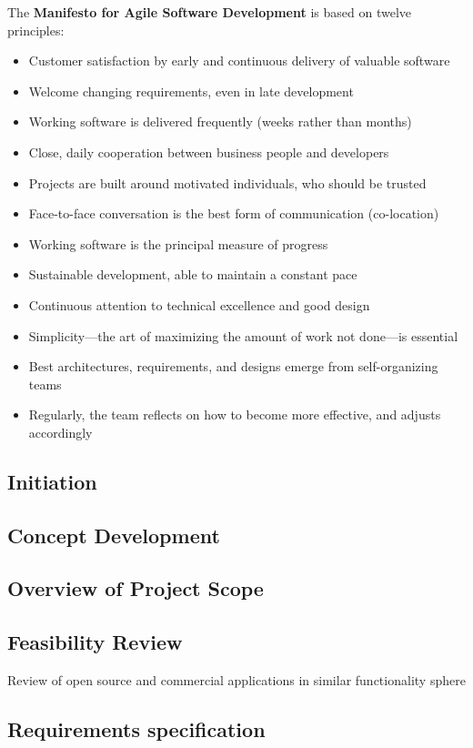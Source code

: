 \documentclass[a4paper,12pt]{article}
\begin{document}
\begin{samepage}
The \textbf{Manifesto for Agile Software Development} is based on twelve principles:
\begin{itemize}
\item Customer satisfaction by early and continuous delivery of valuable software
\item Welcome changing requirements, even in late development
\item Working software is delivered frequently (weeks rather than months)
\item Close, daily cooperation between business people and developers
\item Projects are built around motivated individuals, who should be trusted
\item Face-to-face conversation is the best form of communication (co-location)
\item Working software is the principal measure of progress
\item Sustainable development, able to maintain a constant pace
\item Continuous attention to technical excellence and good design
\item Simplicity—the art of maximizing the amount of work not done—is essential
\item Best architectures, requirements, and designs emerge from self-organizing teams
\item Regularly, the team reflects on how to become more effective, and adjusts accordingly
\end{itemize}
\end{samepage}
\begin{samepage}
\section {Initiation}
\end{samepage}
\begin{samepage}
\section {Concept Development}

\subsection {Overview of Project Scope}
\subsection {Feasibility Review}
Review of open source and commercial applications in similar functionality sphere
\subsection{Requirements specification}
\end{samepage}
\end{document}
